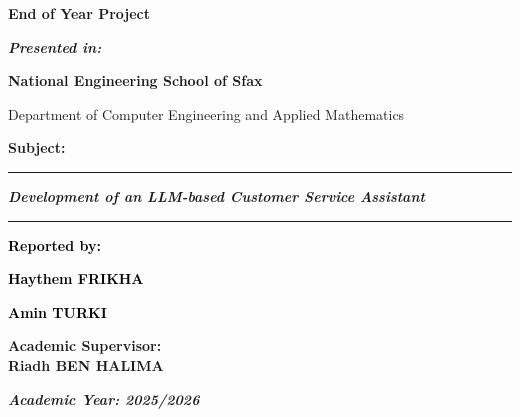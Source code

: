 \begin{center}
    \vspace{40pt}
    \par\textbf{\Huge{End of Year Project}}
    \par\vspace{10pt}
    \par\textbf{\footnotesize{\itshape{\selectfont Presented in:}}}
    \par\vspace{10pt}
    \par\textbf{\normalsize{\selectfont 
National Engineering School of Sfax}}
    \par\normalsize{\selectfont Department of Computer Engineering and Applied Mathematics}
    \par\vspace{10pt}
    

    \vspace{5pt}
    \par\textbf{\large{\textcolor{gray1}{Subject:}}} 
    \par\color{gray}\rule{0.7\linewidth}{2pt}\color{black}
    \par\textbf{\textsl{\Large{ Development of an LLM-based Customer Service Assistant }}}

    \color{gray}\rule{0.7\linewidth}{2pt}\color{black}
    \par \vspace{5pt} \textbf{\textcolor{black}{Reported by:}}
    \par \vspace{5pt} \textbf{\textcolor{black}{Haythem FRIKHA}}
     \par \vspace{5pt} \textbf{\textcolor{black}{Amin TURKI}}
\end{center}

\begin{center}
	\large{\textbf{Academic Supervisor:\\Riadh BEN HALIMA}} \\
\end{center}


\begin{center}
\par\vspace{20pt}\textbf{\textsl{\large{Academic Year: 2025/2026}}}
\end{center}

\newpage
\renewcommand{\headrulewidth}{1.5pt}
\renewcommand{\footrulewidth}{1.5pt}

\lhead{\textsl{\footnotesize{\nouppercase{\rightmark}}}}
\rhead{\textsl{\footnotesize{\nouppercase{\leftmark}}}}
\cfoot{\thepage}

